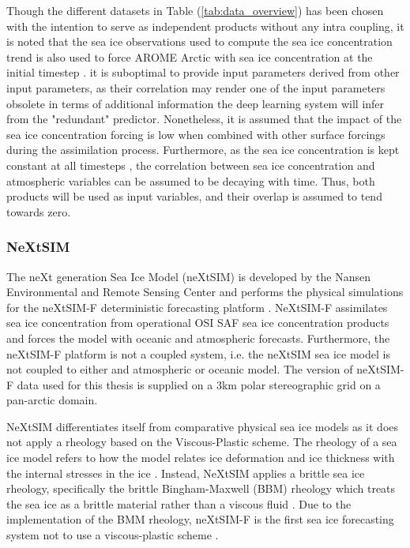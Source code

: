 \documentclass[../main/thesis.tex]{subfiles}
\begin{document}
Though the different datasets in Table (\ref{tab:data_overview}) has been chosen with the intention to serve as independent products without any intra coupling, it is noted that the sea ice observations used to compute the sea ice concentration trend \citep{Tonboe2017} is also used to force AROME Arctic with sea ice concentration at the initial timestep \citep{Mueller2017}. it is suboptimal to provide input parameters derived from other input parameters, as their correlation may render one of the input parameters obsolete in terms of additional information the deep learning system will infer from the "redundant" predictor. Nonetheless, it is assumed that the impact of the sea ice concentration forcing is low when combined with other surface forcings during the assimilation process. Furthermore, as the sea ice concentration is kept constant at all timesteps \citep{Mueller2017}, the correlation between sea ice concentration and atmospheric variables can be assumed to be decaying with time. Thus, both products will be used as input variables, and their overlap is assumed to tend towards zero.


\subsubsection{NeXtSIM}
\label{sec:nextsim}
The neXt generation Sea Ice Model (neXtSIM) is developed by the Nansen Environmental and Remote Sensing Center and performs the physical simulations for the neXtSIM-F deterministic forecasting platform \citep{Williams2021}. NeXtSIM-F assimilates sea ice concentration from operational OSI SAF sea ice concentration products \citep{Tonboe2017, Lavelle2016} and forces the model with oceanic and atmospheric forecasts. Furthermore, the neXtSIM-F platform is not a coupled system, i.e. the neXtSIM sea ice model is not coupled to either and atmospheric or oceanic model. The version of neXtSIM-F data used for this thesis is supplied on a 3km polar stereographic grid on a pan-arctic domain. 

NeXtSIM differentiates itself from comparative physical sea ice models as it does not apply a rheology based on the Viscous-Plastic scheme. The rheology of a sea ice model refers to how the model relates ice deformation and ice thickness with the internal stresses in the ice \citep{Hibler1979}. Instead, NeXtSIM applies a brittle sea ice rheology, specifically the brittle Bingham-Maxwell (BBM) rheology which treats the sea ice as a brittle material rather than a viscous fluid \citep{Olason2022}. Due to the implementation of the BMM rheology, neXtSIM-F is the first sea ice forecasting system not to use a viscous-plastic scheme \citep{Williams2021}.
\end{document}
